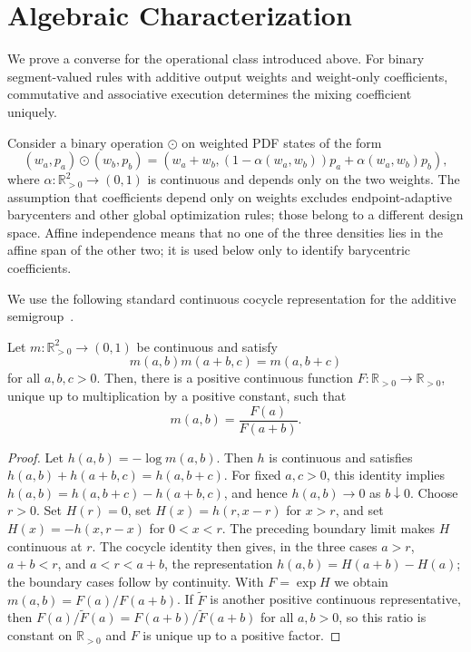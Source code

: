 \documentclass[runningheads]{llncs}
\newcommand{\R}{\mathbb{R}}
\begin{document}
\section{Algebraic Characterization}\label{sec:algebra}

We prove a converse for the operational class introduced above. For binary
segment-valued rules with additive output weights and weight-only coefficients,
commutative and associative execution determines the mixing coefficient uniquely.

Consider a binary operation $\odot$ on weighted PDF states of the form
\begin{equation}
  (w_a,p_a)\odot(w_b,p_b)
  =
  \left(w_a+w_b,
  (1-\alpha(w_a,w_b))p_a+\alpha(w_a,w_b)p_b
  \right),
  \label{eq:general-rule}
\end{equation}
where $\alpha:\R_{>0}^2\to(0,1)$ is continuous and depends only on the two weights. The assumption that coefficients depend only on weights excludes endpoint-adaptive barycenters and other global optimization rules; those belong to a different design space. Affine independence means that no one of the three densities lies in the affine span of the other two; it is used below only to identify barycentric coefficients.

We use the following standard continuous cocycle representation for the additive semigroup~\cite{aczel2006lectures}.
\begin{lemma}
\label{lem:cocycle-representation}
Let $m:\R_{>0}^2\to(0,1)$ be continuous and satisfy
\begin{equation*}
  m(a,b)m(a+b,c)=m(a,b+c)
\end{equation*}
for all $a,b,c>0$. Then, there is a positive continuous function $F:\R_{>0}\to\R_{>0}$, unique up to multiplication by a positive constant, such that
\begin{equation*}
  m(a,b)=\frac{F(a)}{F(a+b)}.
\end{equation*}
\end{lemma}
\begin{proof}
Let $h(a,b)=-\log m(a,b)$. Then $h$ is continuous and satisfies
$h(a,b)+h(a+b,c)=h(a,b+c)$. For fixed $a,c>0$, this identity implies
$h(a,b)=h(a,b+c)-h(a+b,c)$, and hence $h(a,b)\to0$ as $b\downarrow0$.
Choose $r>0$. Set $H(r)=0$, set $H(x)=h(r,x-r)$ for $x>r$, and set
$H(x)=-h(x,r-x)$ for $0<x<r$. The preceding boundary limit makes $H$
continuous at $r$. The cocycle identity then gives, in the three cases
$a>r$, $a+b<r$, and $a<r<a+b$, the representation
$h(a,b)=H(a+b)-H(a)$; the boundary cases follow by continuity. With
$F=\exp H$ we obtain $m(a,b)=F(a)/F(a+b)$. If $\widetilde F$ is another
positive continuous representative, then
$F(a)/\widetilde F(a)=F(a+b)/\widetilde F(a+b)$ for all $a,b>0$, so this
ratio is constant on $\R_{>0}$ and $F$ is unique up to a positive factor.
\end{proof}
\end{document}
